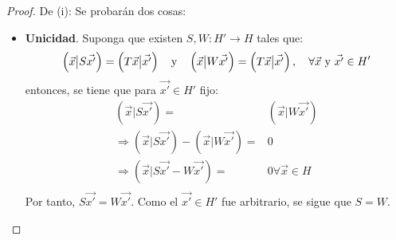 \documentclass[12pt]{report}
\theoremstyle{largebreak}
\newcommand\cf[3]{\ensuremath{#1:#2\rightarrow#3}}
\newcommand\pint[2]{\ensuremath{\left(#1\big|#2\right)}}
\begin{document}
    \begin{proof}
        De (i): Se probarán dos cosas:
        \begin{itemize}
            \item \textbf{Unicidad}. Suponga que existen $\cf{S,W}{H'}{H}$ tales que:
            \begin{equation*}
                \pint{\vec{x}}{S\vec{x'}}=\pint{T\vec{x}}{\vec{x'}}\quad\textup{y}\quad\pint{\vec{x}}{W\vec{x'}}=\pint{T\vec{x}}{\vec{x'}},\quad\forall\vec{x}\textup{ y }\vec{x'}\in H'
            \end{equation*}
            entonces, se tiene que para $\vec{x'}\in H'$ fijo:
            \begin{equation}
                \begin{split}
                    \pint{\vec{x}}{S\vec{x'}}=&\pint{\vec{x}}{W\vec{x'}}\\
                    \Rightarrow \pint{\vec{x}}{S\vec{x'}}-\pint{\vec{x}}{W\vec{x'}}=&0\\
                    \Rightarrow \pint{\vec{x}}{S\vec{x'}-W\vec{x'}}=&0\forall\vec{x}\in H \\
                \end{split}
            \end{equation}
            Por tanto, $S\vec{x'}=W\vec{x'}$. Como el $\vec{x'}\in H'$ fue arbitrario, se sigue que $S=W$.


\end{itemize}
\end{proof}
\end{document}
